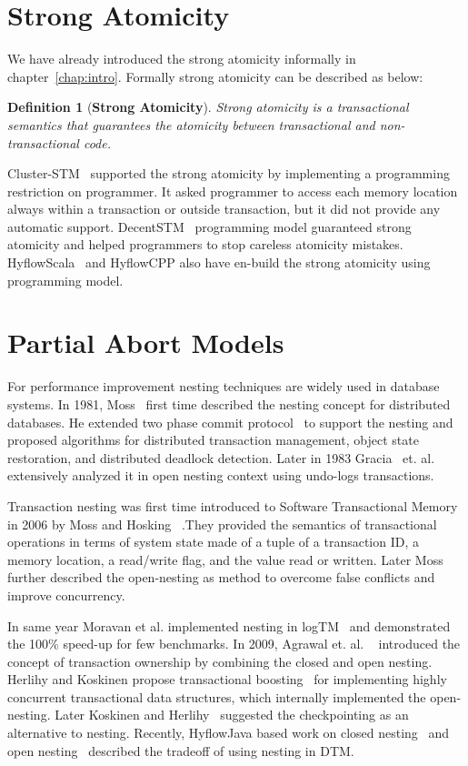 \documentclass[12pt,english]{report}
\newtheorem{definition}{Definition}[section]
\begin{document}
\section{Strong Atomicity}
We have already introduced the strong atomicity informally in chapter~\ref{chap:intro}. Formally strong atomicity can be described as below:

\begin{definition}[\textbf{Strong Atomicity}] 
Strong atomicity is a transactional semantics that guarantees the atomicity between transactional and non-transactional code.
\end{definition}

Cluster-STM~\cite{Bocchino:2008:STM:1345206.1345242} supported the strong atomicity by implementing a programming restriction on programmer. It asked programmer to access each memory location always within a transaction or outside transaction, but it did not provide any automatic support. DecentSTM~\cite{DecentSTM:5470446} programming model guaranteed strong atomicity and helped programmers to stop careless atomicity mistakes. HyflowScala~\cite{turcuhyflow2} and HyflowCPP also have en-build the strong atomicity using programming model.

\section{Partial Abort Models}

For performance improvement nesting techniques are widely used in database systems. In 1981, Moss~\cite{moss1981nested} first time described the nesting concept for distributed databases. He extended two phase commit protocol~\cite{TwoPC:weikum1991principles} to support the nesting and proposed algorithms for distributed transaction management, object state restoration, and distributed deadlock detection. Later in 1983 Gracia~\cite{garcia1983using} et. al. extensively analyzed it in open nesting context using undo-logs transactions. 

Transaction nesting was first time introduced to Software Transactional Memory in 2006 by Moss and Hosking ~\cite{moss2006nested}.They provided the semantics of transactional operations in terms of system state made of a tuple of a transaction ID, a memory location, a read/write flag, and the value read or written. Later Moss ~\cite{moss2006open} further described the open-nesting as method to overcome false conflicts and improve concurrency. 

In same year Moravan et al. implemented nesting in logTM~\cite{moravan2006supporting} and demonstrated the 100\% speed-up for few benchmarks. In 2009, Agrawal et. al. ~\cite{agrawal2009safe} introduced the concept of transaction ownership by combining the closed and open nesting. Herlihy and Koskinen propose transactional boosting~\cite{herlihy2008transactional} for implementing highly concurrent transactional data structures, which internally implemented the open-nesting. Later Koskinen and Herlihy~\cite{koskinen2008checkpoints} suggested the checkpointing as an alternative to nesting. Recently, HyflowJava based work on closed nesting~\cite{turcu2012closed} and open nesting~\cite{turcu2012open} described the tradeoff of using nesting in DTM. 
\end{document}
